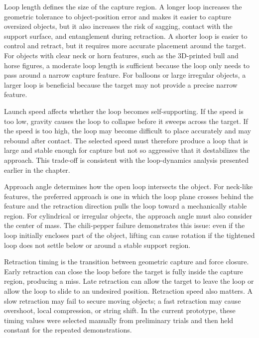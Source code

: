 Loop length defines the size of the capture region. A longer loop increases the geometric tolerance to object-position error and makes it easier to capture oversized objects, but it also increases the risk of sagging, contact with the support surface, and entanglement during retraction. A shorter loop is easier to control and retract, but it requires more accurate placement around the target. For objects with clear neck or horn features, such as the 3D-printed bull and horse figures, a moderate loop length is sufficient because the loop only needs to pass around a narrow capture feature. For balloons or large irregular objects, a larger loop is beneficial because the target may not provide a precise narrow feature.

Launch speed affects whether the loop becomes self-supporting. If the speed is too low, gravity causes the loop to collapse before it sweeps across the target. If the speed is too high, the loop may become difficult to place accurately and may rebound after contact. The selected speed must therefore produce a loop that is large and stable enough for capture but not so aggressive that it destabilizes the approach. This trade-off is consistent with the loop-dynamics analysis presented earlier in the chapter.

Approach angle determines how the open loop intersects the object. For neck-like features, the preferred approach is one in which the loop plane crosses behind the feature and the retraction direction pulls the loop toward a mechanically stable region. For cylindrical or irregular objects, the approach angle must also consider the center of mass. The chili-pepper failure demonstrates this issue: even if the loop initially encloses part of the object, lifting can cause rotation if the tightened loop does not settle below or around a stable support region.

Retraction timing is the transition between geometric capture and force closure. Early retraction can close the loop before the target is fully inside the capture region, producing a miss. Late retraction can allow the target to leave the loop or allow the loop to slide to an undesired position. Retraction speed also matters. A slow retraction may fail to secure moving objects; a fast retraction may cause overshoot, local compression, or string shift. In the current prototype, these timing values were selected manually from preliminary trials and then held constant for the repeated demonstrations.


